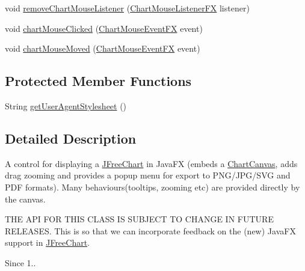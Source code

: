 \begin{DoxyCompactItemize}
\item 
void \mbox{\hyperlink{classorg_1_1jfree_1_1chart_1_1fx_1_1_chart_viewer_a628e7821016d16c266830bd5d7507799}{remove\+Chart\+Mouse\+Listener}} (\mbox{\hyperlink{interfaceorg_1_1jfree_1_1chart_1_1fx_1_1interaction_1_1_chart_mouse_listener_f_x}{Chart\+Mouse\+Listener\+FX}} listener)
\item 
void \mbox{\hyperlink{classorg_1_1jfree_1_1chart_1_1fx_1_1_chart_viewer_ab66028016a6de04fe52b66013545f0bc}{chart\+Mouse\+Clicked}} (\mbox{\hyperlink{classorg_1_1jfree_1_1chart_1_1fx_1_1interaction_1_1_chart_mouse_event_f_x}{Chart\+Mouse\+Event\+FX}} event)
\item 
void \mbox{\hyperlink{classorg_1_1jfree_1_1chart_1_1fx_1_1_chart_viewer_ad9cb6ad74904822db234d14c8356c05d}{chart\+Mouse\+Moved}} (\mbox{\hyperlink{classorg_1_1jfree_1_1chart_1_1fx_1_1interaction_1_1_chart_mouse_event_f_x}{Chart\+Mouse\+Event\+FX}} event)
\end{DoxyCompactItemize}
\subsection*{Protected Member Functions}
\begin{DoxyCompactItemize}
\item 
String \mbox{\hyperlink{classorg_1_1jfree_1_1chart_1_1fx_1_1_chart_viewer_a72fb7fbb60e4fb5ba6eb4a38b534cfa9}{get\+User\+Agent\+Stylesheet}} ()
\end{DoxyCompactItemize}


\subsection{Detailed Description}
A control for displaying a \mbox{\hyperlink{classorg_1_1jfree_1_1chart_1_1_j_free_chart}{J\+Free\+Chart}} in Java\+FX (embeds a \mbox{\hyperlink{classorg_1_1jfree_1_1chart_1_1fx_1_1_chart_canvas}{Chart\+Canvas}}, adds drag zooming and provides a popup menu for export to P\+N\+G/\+J\+P\+G/\+S\+VG and P\+DF formats). Many behaviours(tooltips, zooming etc) are provided directly by the canvas.

T\+HE A\+PI F\+OR T\+H\+IS C\+L\+A\+SS IS S\+U\+B\+J\+E\+CT TO C\+H\+A\+N\+GE IN F\+U\+T\+U\+RE R\+E\+L\+E\+A\+S\+ES. This is so that we can incorporate feedback on the (new) Java\+FX support in \mbox{\hyperlink{classorg_1_1jfree_1_1chart_1_1_j_free_chart}{J\+Free\+Chart}}.

\begin{DoxySince}{Since}
1.. 
\end{DoxySince}


